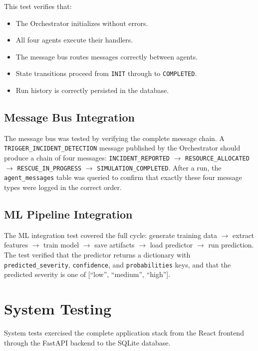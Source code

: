 This test verifies that:
\begin{itemize}[leftmargin=*]
    \item The Orchestrator initializes without errors.
    \item All four agents execute their handlers.
    \item The message bus routes messages correctly between agents.
    \item State transitions proceed from \texttt{INIT} through to \texttt{COMPLETED}.
    \item Run history is correctly persisted in the database.
\end{itemize}

\subsection{Message Bus Integration}

The message bus was tested by verifying the complete message chain. A \texttt{TRIGGER\_INCIDENT\_DETECTION} message published by the Orchestrator should produce a chain of four messages: \texttt{INCIDENT\_REPORTED} $\rightarrow$ \texttt{RESOURCE\_ALLOCATED} $\rightarrow$ \texttt{RESCUE\_IN\_PROGRESS} $\rightarrow$ \texttt{SIMULATION\_COMPLETED}. After a run, the \texttt{agent\_messages} table was queried to confirm that exactly these four message types were logged in the correct order.

\subsection{ML Pipeline Integration}

The ML integration test covered the full cycle: generate training data $\rightarrow$ extract features $\rightarrow$ train model $\rightarrow$ save artifacts $\rightarrow$ load predictor $\rightarrow$ run prediction. The test verified that the predictor returns a dictionary with \texttt{predicted\_severity}, \texttt{confidence}, and \texttt{probabilities} keys, and that the predicted severity is one of [``low'', ``medium'', ``high''].

\section{System Testing}
\label{sec:system_testing}

System tests exercised the complete application stack from the React frontend through the FastAPI backend to the SQLite database.

